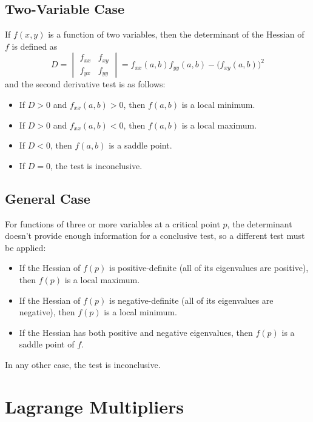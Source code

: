\subsection{Two-Variable Case}

If $f(x,y)$ is a function of two variables, then the determinant of the Hessian of $f$ is defined as $$D = \begin{vmatrix}
f_{xx} & f_{xy} \\
f_{yx} & f_{yy}
\end{vmatrix}
= f_{xx}(a,b)f_{yy}(a,b) - \big( f_{xy}(a,b) \big)^{2}$$ and the second derivative test is as follows: \begin{itemize}
\item If $D > 0$ and $f_{xx}(a,b) > 0$, then $f(a,b)$ is a local minimum.

\item If $D > 0$ and $f_{xx}(a,b) < 0$, then $f(a,b)$ is a local maximum.

\item If $D < 0$, then $f(a,b)$ is a saddle point.

\item If $D = 0$, the test is inconclusive.
\end{itemize}

\subsection{General Case}

For functions of three or more variables at a critical point $p$, the determinant doesn't provide enough information for a conclusive test, so a different test must be applied: \begin{itemize}
\item If the Hessian of $f(p)$ is positive-definite (all of its eigenvalues are positive), then $f(p)$ is a local maximum.

\item If the Hessian of $f(p)$ is negative-definite (all of its eigenvalues are negative), then $f(p)$ is a local minimum.

\item If the Hessian has both positive and negative eigenvalues, then $f(p)$ is a saddle point of $f$.
\end{itemize} In any other case, the test is inconclusive.

\section{Lagrange Multipliers}

